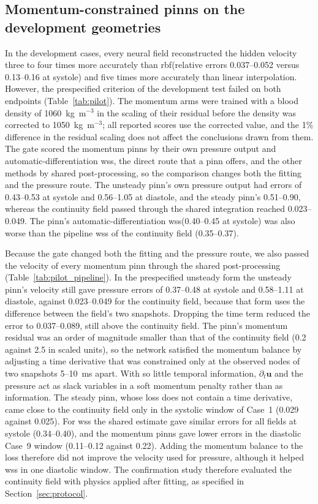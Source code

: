 \documentclass[12pt,a4paper]{article}
\newcommand{\PINN}{\ac{pinn}\xspace}
\newcommand{\PINNs}{\acp{pinn}\xspace}
\newcommand{\WSS}{\ac{wss}\xspace}
\newcommand{\RBF}{\ac{rbf}\xspace}
\theoremstyle{definition}
\numberwithin{equation}{section}
\begin{document}


\subsection{Momentum-constrained \texorpdfstring{\PINNs}{PINNs} on the development geometries}
\label{sec:pilot_results}
In the development cases, every neural field reconstructed the hidden velocity three to four times more accurately than \RBF (relative errors 0.037--0.052 versus 0.13--0.16 at systole) and five times more accurately than linear interpolation. However, the prespecified criterion of the development test failed on both endpoints (Table~\ref{tab:pilot}). The momentum arms were trained with a blood density of 1060~kg~m$^{-3}$ in the scaling of their residual before the density was corrected to 1050~kg~m$^{-3}$; all reported scores use the corrected value, and the 1\% difference in the residual scaling does not affect the conclusions drawn from them. The gate scored the momentum \PINNs by their own pressure output and automatic-differentiation \WSS, the direct route that a \PINN offers, and the other methods by shared post-processing, so the comparison changes both the fitting and the pressure route. The unsteady \PINN's own pressure output had errors of 0.43--0.53 at systole and 0.56--1.05 at diastole, and the steady \PINN's 0.51--0.90, whereas the continuity field passed through the shared integration reached 0.023--0.049. The \PINN's automatic-differentiation \WSS (0.40--0.45 at systole) was also worse than the pipeline \WSS of the continuity field (0.35--0.37).

Because the gate changed both the fitting and the pressure route, we also passed the velocity of every momentum \PINN through the shared post-processing (Table~\ref{tab:pilot_pipeline}). In the prespecified unsteady form the unsteady \PINN's velocity still gave pressure errors of 0.37--0.48 at systole and 0.58--1.11 at diastole, against 0.023--0.049 for the continuity field, because that form uses the difference between the field's two snapshots. Dropping the time term reduced the error to 0.037--0.089, still above the continuity field. The \PINN's momentum residual was an order of magnitude smaller than that of the continuity field (0.2 against 2.5 in scaled units), so the network satisfied the momentum balance by adjusting a time derivative that was constrained only at the observed nodes of two snapshots 5--10~ms apart. With so little temporal information, $\partial_t\mathbf u$ and the pressure act as slack variables in a soft momentum penalty rather than as information. The steady \PINN, whose loss does not contain a time derivative, came close to the continuity field only in the systolic window of Case~1 (0.029 against 0.025). For \WSS the shared estimate gave similar errors for all fields at systole (0.34--0.40), and the momentum \PINNs gave lower errors in the diastolic Case~9 window (0.11--0.12 against 0.22). Adding the momentum balance to the loss therefore did not improve the velocity used for pressure, although it helped \WSS in one diastolic window. The confirmation study therefore evaluated the continuity field with physics applied after fitting, as specified in Section~\ref{sec:protocol}.
\end{document}
